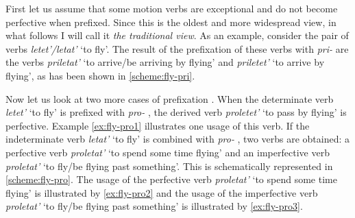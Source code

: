 
First let us assume that some motion verbs are exceptional and do not become perfective   when prefixed. Since this is the oldest and more widespread view, in what follows I will call it \textit{the traditional view}. As an example, consider the pair of verbs \textit{letet'/letat'} `to fly'. The result of the prefixation  of these verbs with \textit{pri-}   are the verbs \textit{priletat'}\textsuperscript{\IPF} `to arrive/be arriving by flying' and \textit{priletet'\textsuperscript{\PF}} `to arrive by flying', as has been shown in \ref{scheme:fly-pri}. 


Now let us look at two more cases of prefixation . When the determinate verb  \textit{letet'}\textsuperscript{\IPF} `to fly' is prefixed with \textit{pro-}  , the derived verb \textit{proletet'}\textsuperscript{\PF} `to pass by flying' is perfective. Example \ref{ex:fly-pro1} illustrates one usage of this verb. If the indeterminate verb  \textit{letat'}\textsuperscript{\IPF} `to fly' is combined with \textit{pro-}  , two verbs are obtained: a perfective verb  \textit{proletat'}\textsuperscript{\PF} `to spend some time flying' and an imperfective verb  \textit{proletat'}\textsuperscript{\IPF} `to fly/be flying past  something'.  This is schematically represented in \ref{scheme:fly-pro}. The usage of the perfective verb  \textit{proletat'}\textsuperscript{\PF} `to spend some time flying' is illustrated by \ref{ex:fly-pro2} and the usage of the imperfective verb  \textit{proletat'}\textsuperscript{\IPF} `to fly/be flying past  something' is illustrated by \ref{ex:fly-pro3}. 

